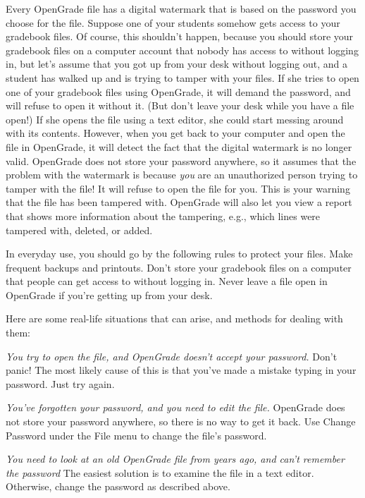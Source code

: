 \documentclass{opengrade_doc}
\begin{document}
\label{authentication}
Every OpenGrade file has a digital watermark that is based on
the password you choose for the file. 
Suppose one of your students somehow gets access to your gradebook
files. Of course, this shouldn't happen, because you should store
your gradebook files on a computer account that nobody has access
to without logging in, but let's assume that you got up from your
desk without logging out, and a student has walked up and is trying
to tamper with your files.
If she tries to open one of your gradebook files using OpenGrade, it
will demand the password, and will refuse to open it without it.
(But don't leave your desk while you have a file open!)
If she opens the file using a text editor, she could start messing
around with its contents. However, when you get back to your computer
and open the file in OpenGrade, it will detect the fact that the
digital watermark is no longer valid. OpenGrade does not store your
password anywhere, so it assumes that the problem with the watermark
is because \emph{you} are an unauthorized person trying to tamper
with the file! It will refuse to open the file for you. This is
your warning that the file has been tampered with. OpenGrade will also
let you view a report that shows more information about the tampering,
e.g., which lines were tampered with, deleted, or added.

In everyday use, you should go by the following rules to protect your
files. Make frequent
backups and printouts. Don't store your gradebook files on a computer
that people can get access to without logging in. Never leave a file
open in OpenGrade if you're getting up from your desk. 

Here are some
real-life situations that can arise, and methods for dealing with
them:

\emph{You try to open the file, and OpenGrade doesn't accept your password.\/}
Don't panic! The most likely cause of this is that you've made a mistake
typing in your password. Just try again.

\emph{You've forgotten your password, and you need to edit the file.\/}
OpenGrade does not store your password anywhere, so there is no
way to get it back.
Use Change Password under the File menu to change the file's password.

\emph{You need to look at an old OpenGrade file from years
ago, and can't remember the password}
The easiest solution is to examine the file in a text editor. Otherwise,
change the password as described above.
\end{document}
